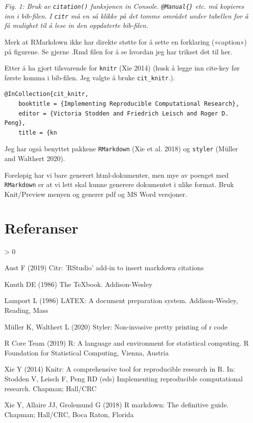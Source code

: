 \documentclass[
]{article}
\newlength{\cslhangindent}
\newenvironment{CSLReferences}[2] %
 {%
  \setlength{\parindent}{0pt}
  \ifodd #1 \everypar{\setlength{\hangindent}{\cslhangindent}}\ignorespaces\fi
  \ifnum #2 > 0
  \setlength{\parskip}{#2\baselineskip}
  \fi
 }%
 {}
\begin{document}
\emph{Fig. 1: Bruk av \texttt{citation()} funksjonen in Console.
\texttt{@Manual\{\}} etc. må kopieres inn i bib-filen. I \texttt{citr}
må en så klikke på det tomme området under tabellen for å få mulighet
til å lese in den oppdaterte bib-filen.}

Merk at RMarkdown ikke har direkte støtte for å sette en forklaring
(«caption») på figurene. Se gjerne .Rmd filen for å se hvordan jeg har
trikset det til her.

Etter å ha gjort tilsvarende for \texttt{knitr} (Xie 2014) (husk å legge
inn cite-key før første komma i bib-filen. Jeg valgte å bruke
\texttt{cit\_knitr}.).

\begin{verbatim}
@InCollection{cit_knitr,
    booktitle = {Implementing Reproducible Computational Research},
    editor = {Victoria Stodden and Friedrich Leisch and Roger D. Peng},
    title = {kn
\end{verbatim}

Jeg har også benyttet pakkene \texttt{RMarkdown} (Xie et al. 2018) og
\texttt{styler} (Müller and Walthert 2020).

Foreløpig har vi bare generert html-dokumenter, men mye av poenget med
\texttt{RMarkdown} er at vi lett skal kunne generere dokumentet i ulike
format. Bruk Knit/Preview menyen og generer pdf og MS Word versjoner.

\hypertarget{referanser}{%
\section*{Referanser}\label{referanser}}

\hypertarget{refs}{}
\begin{CSLReferences}{1}{0}
\leavevmode\hypertarget{ref-citr}{}%
Aust F (2019) Citr: 'RStudio' add-in to insert markdown citations

\leavevmode\hypertarget{ref-knuth1986texbook}{}%
Knuth DE (1986) The {TeXbook}. {Addison-Wesley}

\leavevmode\hypertarget{ref-lamport1986}{}%
Lamport L (1986) {LATEX}: A document preparation system.
{Addison-Wesley}, {Reading, Mass}

\leavevmode\hypertarget{ref-cit_styler}{}%
Müller K, Walthert L (2020) Styler: Non-invasive pretty printing of r
code

\leavevmode\hypertarget{ref-R_cit}{}%
R Core Team (2019) R: A language and environment for statistical
computing. R Foundation for Statistical Computing, Vienna, Austria

\leavevmode\hypertarget{ref-cit_knitr}{}%
Xie Y (2014) Knitr: A comprehensive tool for reproducible research in
{R}. In: Stodden V, Leisch F, Peng RD (eds) Implementing reproducible
computational research. Chapman; Hall/CRC

\leavevmode\hypertarget{ref-cit_rmarkdown}{}%
Xie Y, Allaire JJ, Grolemund G (2018) R markdown: The definitive guide.
Chapman; Hall/CRC, Boca Raton, Florida

\end{CSLReferences}
\end{document}
